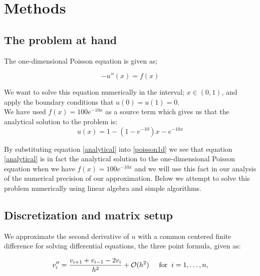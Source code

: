 \documentclass[12pt]{article}
\numberwithin{figure}{section}
\numberwithin{table}{section}
\begin{document}
\section{Methods}

\subsection{The problem at hand}
\noindent The one-dimensional Poisson equation is given as;

\begin{equation}
-u''(x) = f(x) \label{poisson1d}
\end{equation}

\noindent We want to solve this equation numerically in the interval; $x\in(0,1)$, and apply the boundary conditions that  $u(0) = u(1) = 0$.\\

\noindent We have used $f(x)=100e^{-10x}$ as a source term which gives us that the analytical solution to the problem is:
\begin{equation}
u(x) =1 - (1-e^{-10})x - e^{-10x} \label{analytical}
\end{equation}

\noindent By substituting equation \eqref{analytical} into \eqref{poisson1d} we see that equation \eqref{analytical} is in fact the analytical solution to the one-dimensional Poisson equation when we have $f(x)=100e^{-10x}$ and we will use this fact in our analysis of the numerical precision of our approximation. Below we attempt to solve this problem numerically using linear algebra and simple algorithms. \\


\subsection{Discretization and matrix setup}
We approximate the second derivative of $u$ with a common centered finite difference for solving differential equations, the three point formula, given as:

\begin{equation}
   v_i'' = \frac{v_{i+1}+v_{i-1}-2v_i}{h^2} + \mathcal{O}(h^2)    \hspace{0.5cm} \mathrm{for} \hspace{0.2cm} i=1,\dots, n, \label{discretization}
\end{equation}
\end{document}
